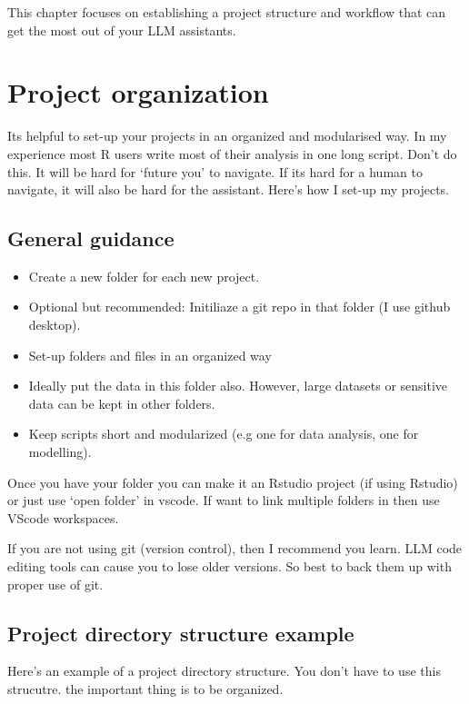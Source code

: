 \documentclass[
  letterpaper,
  DIV=11,
  numbers=noendperiod]{scrreprt}
\providecommand{\tightlist}{%
  \setlength{\itemsep}{0pt}\setlength{\parskip}{0pt}}\usepackage{longtable,booktabs,array}
\begin{document}
This chapter focuses on establishing a project structure and workflow
that can get the most out of your LLM assistants.

\section{Project organization}\label{project-organization}

Its helpful to set-up your projects in an organized and modularised way.
In my experience most R users write most of their analysis in one long
script. Don't do this. It will be hard for `future you' to navigate. If
its hard for a human to navigate, it will also be hard for the
assistant. Here's how I set-up my projects.

\subsection{General guidance}\label{general-guidance}

\begin{itemize}
\tightlist
\item
  Create a new folder for each new project.
\item
  Optional but recommended: Initiliaze a git repo in that folder (I use
  github desktop).
\item
  Set-up folders and files in an organized way
\item
  Ideally put the data in this folder also. However, large datasets or
  sensitive data can be kept in other folders.
\item
  Keep scripts short and modularized (e.g one for data analysis, one for
  modelling).
\end{itemize}

Once you have your folder you can make it an Rstudio project (if using
Rstudio) or just use `open folder' in vscode. If want to link multiple
folders in then use VScode workspaces.

If you are not using git (version control), then I recommend you learn.
LLM code editing tools can cause you to lose older versions. So best to
back them up with proper use of git.

\subsection{Project directory structure
example}\label{project-directory-structure-example}

Here's an example of a project directory structure. You don't have to
use this strucutre. the important thing is to be organized.
\end{document}
